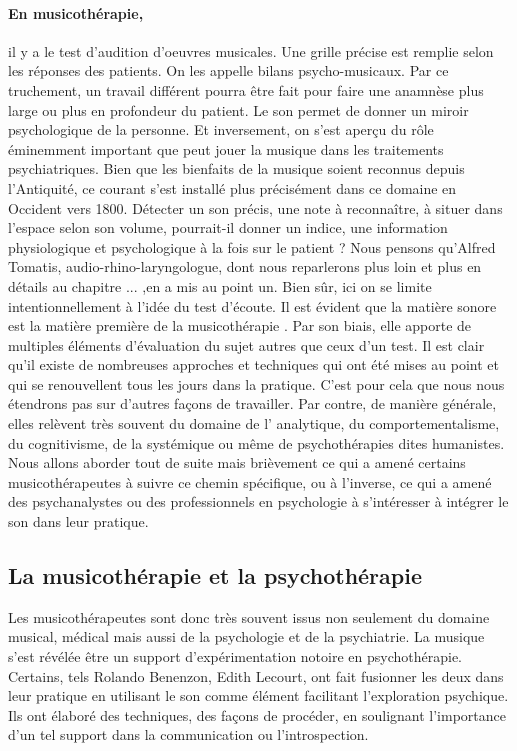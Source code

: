 \paragraph*{En musicothérapie,}il y a le test d'audition d'oeuvres musicales. Une grille précise est remplie selon les réponses des patients. On les appelle bilans psycho-musicaux. Par ce truchement, un travail différent pourra être fait pour faire une anamnèse plus large ou plus en profondeur du patient. Le son permet de donner un miroir psychologique de la personne. Et inversement, on s'est aperçu du rôle éminemment important que peut jouer la musique dans les traitements psychiatriques. Bien que les bienfaits de la musique soient reconnus depuis l'Antiquité, ce courant s'est installé plus précisément dans ce domaine en Occident vers 1800.
 Détecter un son précis, une note à reconnaître,  à situer dans l'espace selon son volume,  pourrait-il donner   un indice, une information physiologique et psychologique à la fois sur le patient ? Nous pensons qu'Alfred Tomatis, audio-rhino-laryngologue, dont nous reparlerons plus loin et plus en détails au chapitre ... ,en a mis au point un. 
 Bien sûr, ici on se limite intentionnellement à l'idée du test d'écoute. Il est évident que la matière sonore est la matière première de la  musicothérapie . Par son biais, elle  apporte de multiples éléments d'évaluation du sujet  autres que ceux d'un test. Il est clair qu'il existe de nombreuses approches et techniques qui ont été mises au point  et qui se renouvellent tous les jours dans la pratique. C'est pour cela que nous nous étendrons pas sur d'autres façons de travailler. Par contre, de manière générale, elles relèvent très souvent du domaine de l' analytique, du comportementalisme, du cognitivisme, de la  systémique ou même de psychothérapies dites humanistes. Nous allons aborder tout de suite mais brièvement ce qui a amené certains musicothérapeutes à suivre ce chemin spécifique, ou à  l'inverse, ce qui a amené des psychanalystes ou des professionnels en psychologie à s'intéresser à intégrer le son dans leur pratique.
 
 

 
 
 
\subsection{La musicothérapie et la psychothérapie}

	 Les musicothérapeutes sont donc très souvent  issus non seulement du domaine musical, médical mais aussi  de  la psychologie et de la psychiatrie. La musique s'est révélée être  un support d'expérimentation notoire en psychothérapie. Certains, tels Rolando Benenzon, Edith Lecourt,  ont fait fusionner les deux dans leur pratique  en utilisant le son comme élément facilitant l'exploration psychique. Ils ont élaboré des techniques, des façons de procéder, en soulignant l'importance d'un tel support dans la  communication ou l'introspection.
